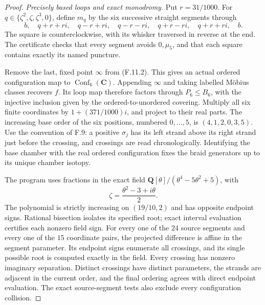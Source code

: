 \begin{proof}
\emph{Precisely based loops and exact monodromy.}
Put $r=31/1000$.  For
$q\in\{\zeta^2,\zeta,\zeta^3,0\}$,
define $m_q$ by the six successive straight
segments through
\[
 b,\quad q+r+ri,\quad q-r+ri,\quad
 q-r-ri,\quad q+r-ri,\quad q+r+ri,\quad b.
                                                               \tag{F.11.14}
\]
The square is counterclockwise, with its
whisker traversed in reverse at the end.
The certificate checks that every segment
avoids $0,\mu_5$, and that each square contains
exactly its named puncture.

Remove the last, fixed point $\infty$ from
(F.11.2).  This gives an actual ordered
configuration map to $\operatorname{Conf}_6(\mathbf C)$.
Appending $\infty$ and taking labelled M\"obius
classes recovers $f$.
Its loop map therefore factors through
$P_6\leq B_6$, with the injective inclusion
given by the ordered-to-unordered covering.
Multiply all six finite coordinates by
$1+(371/1000)i$, and project to their real parts.
The increasing base order of the six positions,
numbered $0,\ldots,5$, is
$(4,1,2,0,3,5)$.
Use the convention of F.9: a positive
$\sigma_j$ has its left strand above its
right strand just before the crossing,
and crossings are read chronologically.
Identifying the base chamber with the real
ordered configuration fixes the braid
generators up to its unique chamber isotopy.

The program
uses fractions in the exact field
$\mathbf Q[\theta]/(\theta^4-5\theta^2+5)$,
with
\[
             \zeta=\frac{\theta^2-3+i\theta}{2}.
                                                               \tag{F.11.15}
\]
The polynomial is strictly increasing on
$(19/10,2)$ and has opposite endpoint signs.
Rational bisection isolates its specified
root; exact interval evaluation certifies
each nonzero field sign.
For every one of the $24$ source segments
and every one of the $15$ coordinate pairs,
the projected difference is affine in
the segment parameter.  Its endpoint signs
enumerate all crossings, and its single
possible root is computed exactly in the field.
Every crossing has nonzero imaginary
separation.  Distinct crossings have distinct
parameters, the strands are adjacent in
the current order, and the final ordering
agrees with direct endpoint evaluation.
The exact source-segment tests also exclude
every configuration collision.


\end{proof}
